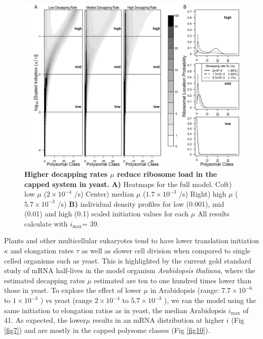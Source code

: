 \documentclass[10pt,letterpaper]{article}
\newcommand{\imax}{\ensuremath{{i_{\max}}}\xspace}
\begin{document}
\begin{figure}[!h]
  \begin{center}
    \includegraphics[width=140mm]{Images/2023-07-09_Figure2_Marking_Rate_range_medianlength_with_labels.png}
    \caption{{\bf Higher decapping rates $\mu$ reduce ribosome load in the capped system in yeast.}  {\bf A)}  Heatmaps for the full model.
      Coft) low $\mu$ ($2\times 10^{-4}$ /s) Center) median $\mu$ ($1.7\times 10^{-3}$ /s) Right) high $\mu$ ($5.7\times 10^{-3}$ /s) {\bf  B)} individual density profiles for low (0.001), mid (0.01) and high (0.1) scaled initiation values for each $\mu$ All results calculate with \imax = 39.}
    \label{fig6}
  \end{center}
\end{figure}


Plants and other multicellular eukaryotes tend to have lower translation initiation $\kappa$ and elongation rates $\tau$ as well as slower cell division when compared to single celled organisms such as yeast.
This is highlighted by the current gold standard study of mRNA half-lives in the model organism \textit{Arabidopsis thaliana}, where the estimated decapping rates $\mu$ estimated are ten to one hundred times lower than those in yeast. 
To explore the effect of lower $\mu$ in Arabidopsis (range: $7.7 \times 10^{-6}$ to $1 \times 10^{-3}$ ) vs yeast (range $2 \times 10^{-4}$ to $5.7 \times 10^{-3}$ ), we ran the model using the same initiation to elongation ratios as in yeast, the median Arabidopsis \imax of 41. 
As expected, the lower$\mu$ results in an mRNA distribution at higher $i$ (Fig \ref{fig7}) and are mostly in the capped polysome classes (Fig \ref{fig10}).
\end{document}
